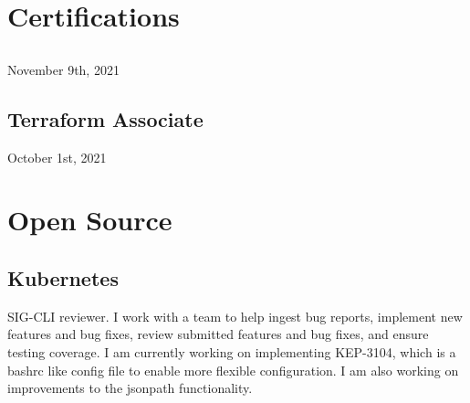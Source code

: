 \documentclass[letterpaper]{deedy-resume-openfont} %
\begin{document}
\begin{minipage}[t]{0.28\textwidth}
\sectionspace
\vspace{-10pt} %


\section{Certifications}
\subsection{}
 November 9th, 2021 \\
 
\sectionspace

\subsection{Terraform Associate}
October 1st, 2021

\sectionspace %
\vspace{-10pt} %


\section{Open Source}
\subsection{Kubernetes}
SIG-CLI reviewer. I work with a team to help ingest bug reports, implement new features and bug fixes, review submitted features and bug fixes, and ensure testing coverage. I am currently working on implementing KEP-3104, which is a bashrc like config file to enable more flexible configuration. I am also working on improvements to the jsonpath functionality. \\

\end{minipage} %
\hfill
%
%
\end{document}
